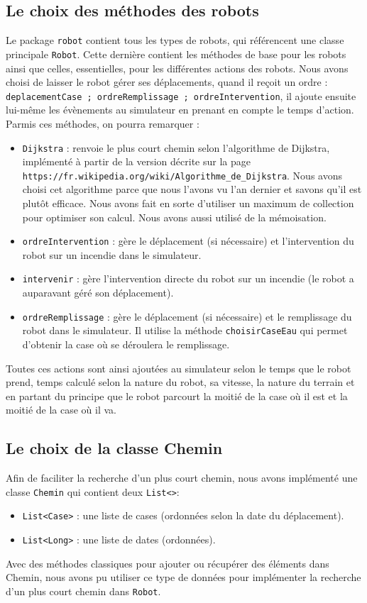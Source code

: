 \documentclass[12pt]{article}
\begin{document}
\subsection{Le choix des méthodes des robots}
Le package {\tt robot} contient tous les types de robots, qui référencent une classe principale {\tt Robot}. Cette dernière contient les méthodes de base pour les robots ainsi que celles, essentielles, pour les différentes actions des robots. Nous avons choisi de laisser le robot gérer ses déplacements, quand il reçoit un ordre : {\tt deplacementCase ; ordreRemplissage ; ordreIntervention}, il ajoute ensuite lui-même les évènements au simulateur en prenant en compte le temps d'action.\\
Parmis ces méthodes, on pourra remarquer :
\begin{itemize}
  \item {\tt Dijkstra} : renvoie le plus court chemin selon l'algorithme de Dijkstra, implémenté à partir de la version décrite sur la page \\ {\tt  https://fr.wikipedia.org/wiki/Algorithme\_de\_Dijkstra}. Nous avons choisi cet algorithme parce que nous l'avons vu l'an dernier et savons qu'il est plutôt efficace. Nous avons fait en sorte d'utiliser un maximum de collection pour optimiser son calcul. Nous avons aussi utilisé de la mémoisation.
  \item {\tt ordreIntervention} : gère le déplacement (si nécessaire) et l'intervention du robot sur un incendie dans le simulateur.
  \item {\tt intervenir} : gère l'intervention directe du robot sur un incendie (le robot a auparavant géré son déplacement).
  \item {\tt ordreRemplissage} : gère le déplacement (si nécessaire) et le remplissage du robot dans le simulateur. Il utilise la méthode {\tt choisirCaseEau} qui permet d'obtenir la case où se déroulera le remplissage.
\end{itemize}
Toutes ces actions sont ainsi ajoutées au simulateur selon le temps que le robot prend, temps calculé selon la nature du robot, sa vitesse, la nature du terrain et en partant du principe que le robot parcourt la moitié de la case où il est et la moitié de la case où il va.

\subsection{Le choix de la classe Chemin}
Afin de faciliter la recherche d'un plus court chemin, nous avons implémenté une classe {\tt Chemin} qui contient deux {\tt List<>}:
\begin{itemize}
  \item {\tt List<Case>} : une liste de cases (ordonnées selon la date du déplacement).
  \item {\tt List<Long>} : une liste de dates (ordonnées).
\end{itemize}
Avec des méthodes classiques pour ajouter ou récupérer des éléments dans Chemin, nous avons pu utiliser ce type de données pour implémenter la recherche d'un plus court chemin dans {\tt Robot}.
\end{document}
